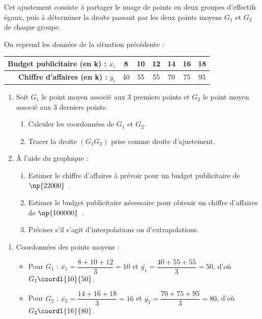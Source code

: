 \begin{methode}
	Cet ajustement consiste à partager le nuage de points en deux groupes d'effectifs égaux, puis à déterminer la droite passant par les deux points moyens $G_1$ et $G_2$ de chaque groupe.

	On reprend les données de la situation précédente :

	\begin{center}
		\begin{tabular}{|r||c|c|c||c|c|c|} \hline
			\ccg \textbf{Budget publicitaire (en k\eur{}) :} $x_i$ & 8  & 10 & 12 & 14 & 16 & 18 \\ \hline
			\ccg \textbf{Chiffre d'affaires (en k\eur{}) :} $y_i$  & 40 & 55 & 55 & 70 & 75 & 95 \\ \hline
		\end{tabular}
	\end{center}

	\begin{enumerate}
		\item Soit $G_1$ le point moyen associé aux 3 premiers points et $G_2$ le point moyen associé aux 3 derniers points.
		      \begin{enumerate}
			      \item Calculer les coordonnées de $G_1$ et $G_2$.
			      \item Tracer la droite $(G_1G_2)$ prise comme droite d'ajustement.
		      \end{enumerate}
		\item À l'aide du graphique :
		      \begin{enumerate}
			      \item Estimer le chiffre d'affaires à prévoir pour un budget publicitaire de $\np{22000}$~\eur{}.
			      \item Estimer le budget publicitaire nécessaire pour obtenir un chiffre d'affaires de $\np{100000}$~\eur{}.
			      \item Préciser s'il s'agit d'interpolations ou d'extrapolations.
		      \end{enumerate}
	\end{enumerate}

	\begin{correction}
		\nline
		\begin{enumerate}
			\item Coordonnées des points moyens :
			      \begin{itemize}
				      \item Pour $G_1$ : $\bar{x_1} = \dfrac{8+10+12}{3} = 10$ et $\bar{y_1} = \dfrac{40+55+55}{3} = 50$, d'où $G_1\coordl{10}{50}$.
				      \item Pour $G_2$ : $\bar{x_2} = \dfrac{14+16+18}{3} = 16$ et $\bar{y_2} = \dfrac{70+75+95}{3} = 80$, d'où $G_2\coordl{16}{80}$.
			      \end{itemize}


\end{enumerate}
\end{correction}
\end{methode}
